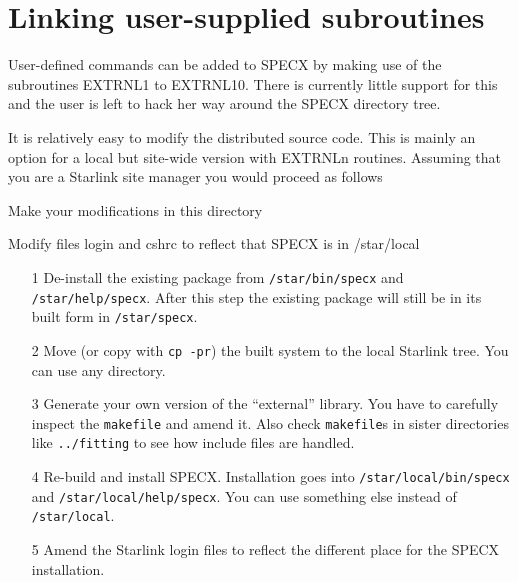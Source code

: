 \documentclass[twoside,11pt,nolof]{starlink}
\begin{document}
\section{Linking user-supplied subroutines}

User-defined commands can be added to SPECX by making use of the
subroutines EXTRNL1 to EXTRNL10. There is currently little support for
this and the user is left to hack her way around the SPECX directory
tree.

It is relatively easy to modify the distributed source code. This is
mainly an option for a local but site-wide version with EXTRNLn
routines. Assuming that you are a Starlink site manager you would
proceed as follows

\begin{terminalv}


{Make your modifications in this directory}


{Modify files login and cshrc to reflect that SPECX is in /star/local}
\end{terminalv}

\begin{itemize}
\item[1] De-install the existing package from \texttt{/star/bin/specx} and
   \texttt{/star/help/specx}. After this step the existing package will
   still be in its built form in \texttt{/star/specx}.
\item[2] Move (or copy with \texttt{cp -pr}) the built system to the local
   Starlink tree. You can use any directory.
\item[3] Generate your own version of the ``external'' library. You have
   to carefully inspect the \texttt{makefile} and amend it. Also check \texttt{makefile}s in sister directories like \texttt{../fitting} to see how
   include files are handled.
\item[4] Re-build and install SPECX. Installation goes into \texttt{/star/local/bin/specx} and \texttt{/star/\-local/help/specx}. You can use
   something else instead of \texttt{/star/local}.
\item[5] Amend the Starlink login files to reflect the different place
   for the SPECX installation.
\end{itemize}
\end{document}
